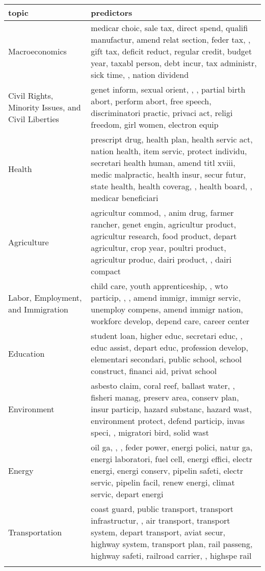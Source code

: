 \begingroup\tiny
\begin{longtable}{p{}p{}}
  \hline
topic & predictors \\ 
  \hline
Macroeconomics & medicar choic, sale tax, direct spend, qualifi manufactur, amend relat section, feder tax, {\color{red}{public debt}}, gift tax, deficit reduct, regular credit, budget year, taxabl person, debt incur, tax administr, sick time, {\color{red}{capit gain}}, nation dividend \\ 
   \hline
Civil Rights, Minority Issues, and Civil Liberties & genet inform, sexual orient, {\color{red}{vote right}}, {\color{red}{racial profil}}, partial birth abort, perform abort, free speech, discriminatori practic, privaci act, religi freedom, girl women, electron equip \\ 
   \hline
Health & prescript drug, health plan, health servic act, nation health, item servic, protect individu, secretari health human, amend titl xviii, medic malpractic, health insur, secur futur, state health, health coverag, {\color{red}{public health servic}}, health board, {\color{red}{medicar program}}, medicar beneficiari \\ 
   \hline
Agriculture & agricultur commod, {\color{red}{food safeti}}, anim drug, farmer rancher, genet engin, agricultur product, agricultur research, food product, depart agricultur, crop year, poultri product, agricultur produc, dairi product, {\color{red}{farm credit}}, dairi compact \\ 
   \hline
Labor, Employment, and Immigration & child care, youth apprenticeship, {\color{red}{illeg alien}}, wto particip, {\color{red}{immigr enforc}}, {\color{red}{pension plan}}, amend immigr, immigr servic, unemploy compens, amend immigr nation, workforc develop, depend care, career center\\ 
   \hline
Education & student loan, higher educ, secretari educ, {\color{red}{head start}}, educ assist, depart educ, profession develop, elementari secondari, public school, school construct, financi aid, privat school \\ 
   \hline
Environment & asbesto claim, coral reef, ballast water, {\color{red}{toxic mold}}, fisheri manag, preserv area, conserv plan, insur particip, hazard substanc, hazard wast, environment protect, defend particip, invas speci, {\color{red}{water qualiti}}, migratori bird, solid wast \\ 
   \hline
Energy & oil ga, {\color{red}{crude oil}}, {\color{red}{clean energi}}, feder power, energi polici, natur ga, energi laboratori, fuel cell, energi effici, electr energi, energi conserv, pipelin safeti, electr servic, pipelin facil, renew energi, climat servic, depart energi \\ 
   \hline
Transportation & coast guard, public transport, transport infrastructur, {\color{red}{rail carrier}}, air transport, transport system, depart transport, aviat secur, highway system, transport plan, rail passeng, highway safeti, railroad carrier, {\color{red}{northeast corridor}}, highspe rail \\ 
 \hline
\label{tab:top20_major}
\end{longtable}
\endgroup
